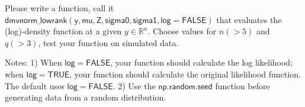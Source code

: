 \documentclass[twoside, letter]{article}
\begin{document}
Please write a function, call it 
$\mathsf{dmvnorm\_lowrank(y, mu, Z, sigma0, sigma1, log = FALSE)}$
that evaluates the (log)-density function at a given $y \in \mathbb{R}^n$.
Choose values for $n (> 5)$ and $q (> 3)$, test your function on simulated data.

Notes: 
1) When $\mathsf{log = FALSE}$, your function should calculate the log likelihood; when 
$\mathsf{log = TRUE}$, your function should calculate the original likelihood function. 
The default uses $\mathsf{log = FALSE}$. 
2) Use the $\mathsf{np.random.seed}$ function before generating data from a random distribution.




 
\end{document}
